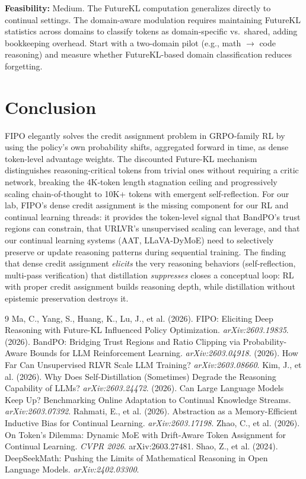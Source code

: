 \documentclass[11pt]{article}
\begin{document}
\textbf{Feasibility:} Medium. The FutureKL computation generalizes directly to continual settings. The domain-aware modulation requires maintaining FutureKL statistics across domains to classify tokens as domain-specific vs.\ shared, adding bookkeeping overhead. Start with a two-domain pilot (e.g., math $\to$ code reasoning) and measure whether FutureKL-based domain classification reduces forgetting.

\section{Conclusion}

FIPO elegantly solves the credit assignment problem in GRPO-family RL by using the policy's own probability shifts, aggregated forward in time, as dense token-level advantage weights. The discounted Future-KL mechanism distinguishes reasoning-critical tokens from trivial ones without requiring a critic network, breaking the 4K-token length stagnation ceiling and progressively scaling chain-of-thought to 10K+ tokens with emergent self-reflection. For our lab, FIPO's dense credit assignment is the missing component for our RL and continual learning threads: it provides the token-level signal that BandPO's trust regions can constrain, that URLVR's unsupervised scaling can leverage, and that our continual learning systems (AAT, LLaVA-DyMoE) need to selectively preserve or update reasoning patterns during sequential training. The finding that dense credit assignment \textit{elicits} the very reasoning behaviors (self-reflection, multi-pass verification) that distillation \textit{suppresses} closes a conceptual loop: RL with proper credit assignment builds reasoning depth, while distillation without epistemic preservation destroys it.

\begin{thebibliography}{9}
 Ma, C., Yang, S., Huang, K., Lu, J., et al. (2026). FIPO: Eliciting Deep Reasoning with Future-KL Influenced Policy Optimization. \textit{arXiv:2603.19835}.
 (2026). BandPO: Bridging Trust Regions and Ratio Clipping via Probability-Aware Bounds for LLM Reinforcement Learning. \textit{arXiv:2603.04918}.
 (2026). How Far Can Unsupervised RLVR Scale LLM Training? \textit{arXiv:2603.08660}.
 Kim, J., et al. (2026). Why Does Self-Distillation (Sometimes) Degrade the Reasoning Capability of LLMs? \textit{arXiv:2603.24472}.
 (2026). Can Large Language Models Keep Up? Benchmarking Online Adaptation to Continual Knowledge Streams. \textit{arXiv:2603.07392}.
 Rahmati, E., et al. (2026). Abstraction as a Memory-Efficient Inductive Bias for Continual Learning. \textit{arXiv:2603.17198}.
 Zhao, C., et al. (2026). On Token's Dilemma: Dynamic MoE with Drift-Aware Token Assignment for Continual Learning. \textit{CVPR 2026}. arXiv:2603.27481.
 Shao, Z., et al. (2024). DeepSeekMath: Pushing the Limits of Mathematical Reasoning in Open Language Models. \textit{arXiv:2402.03300}.
\end{thebibliography}
\end{document}
